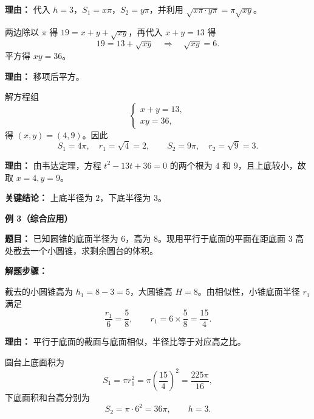 \begin{examplebox}
\begin{description}[style=nextline, leftmargin=2.8em, labelsep=0.5em, itemsep=0.45em]
		      \par\textbf{理由：} 代入 $h=3$，$S_1=x\pi$，$S_2=y\pi$，并利用 $\sqrt{x\pi\cdot y\pi}=\pi\sqrt{xy}$。

		\item[\textbf{第二步（求 $\sqrt{xy}$）：}]
		      两边除以 $\pi$ 得 $19=x+y+\sqrt{xy}$，再代入 $x+y=13$ 得
		      \[
			      19=13+\sqrt{xy}\quad\Rightarrow\quad\sqrt{xy}=6.
		      \]
		      平方得 $xy=36$。

		      \par\textbf{理由：} 移项后平方。

		\item[\textbf{第三步（求半径）：}]
		      解方程组
		      \[
			      \begin{cases}
				      x+y=13, \\
				      xy=36,
			      \end{cases}
		      \]
		      得 $(x,y)=(4,9)$。因此
		      \[
			      S_1=4\pi,
			      \quad r_1=\sqrt{4}=2,
			      \qquad
			      S_2=9\pi,
			      \quad r_2=\sqrt{9}=3.
		      \]

		      \par\textbf{理由：} 由韦达定理，方程 $t^2-13t+36=0$ 的两个根为 $4$ 和 $9$，且上底较小，故取 $x=4,y=9$。
	\end{description}

	\textbf{\textcolor{CExample}{关键结论：}} 上底半径为 $2$，下底半径为 $3$。

	\medskip

	\textbf{\textcolor{CExample}{例 3（综合应用）}}

	\textbf{\textcolor{CExample}{题目：}} 已知圆锥的底面半径为 $6$，高为 $8$。现用平行于底面的平面在距底面 $3$ 高处截去一个小圆锥，求剩余圆台的体积。

	\textbf{\textcolor{CExample}{解题步骤：}}

	\begin{description}[style=nextline, leftmargin=2.8em, labelsep=0.5em, itemsep=0.45em]
		\item[\textbf{第一步（求小锥底面半径）：}]
		      截去的小圆锥高为 $h_1=8-3=5$，大圆锥高 $H=8$。由相似性，小锥底面半径 $r_1$ 满足
		      \[
			      \frac{r_1}{6}=\frac{5}{8},
			      \qquad
			      r_1=6\times\frac58=\frac{15}{4}.
		      \]

		      \par\textbf{理由：} 平行于底面的截面与底面相似，半径比等于对应高之比。

		\item[\textbf{第二步（求上下底面积）：}]
		      圆台上底面积为
		      \[
			      S_1=\pi r_1^2=\pi\left(\frac{15}{4}\right)^2=\frac{225\pi}{16},
		      \]
		      下底面积和台高分别为
		      \[
			      S_2=\pi\cdot6^2=36\pi,
			      \qquad h=3.
		      \]


\end{description}
\end{examplebox}

